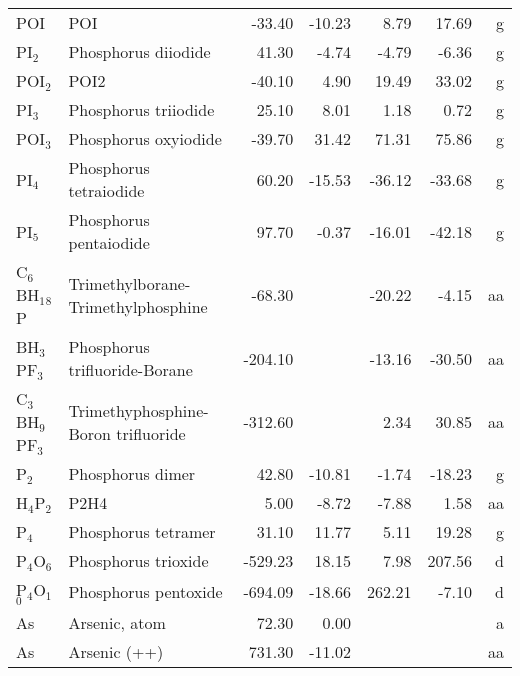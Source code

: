 \begin{table}
\begin{center}
\begin{tabular}{llrrrrr}
 POI         & POI                                    &   -33.40    &   -10.23  &     8.79  &    17.69  &      g\\
 PI$_2$         & Phosphorus diiodide                    &    41.30    &    -4.74  &    -4.79  &    -6.36  &      g\\
 POI$_2$        & POI2                                   &   -40.10    &     4.90  &    19.49  &    33.02  &      g\\
 PI$_3$         & Phosphorus triiodide                   &    25.10    &     8.01  &     1.18  &     0.72  &      g\\
 POI$_3$        & Phosphorus oxyiodide                   &   -39.70    &    31.42  &    71.31  &    75.86  &      g\\
 PI$_4$         & Phosphorus tetraiodide                 &    60.20    &   -15.53  &   -36.12  &   -33.68  &      g\\
 PI$_5$         & Phosphorus pentaiodide                 &    97.70    &    -0.37  &   -16.01  &   -42.18  &      g\\
 C$_6$BH$_1$$_8$P     & Trimethylborane-Trimethylphosphine      &  -68.30    &  &   -20.22  &    -4.15  &     aa\\
 BH$_3$PF$_3$      & Phosphorus trifluoride-Borane          &  -204.10    &  &   -13.16  &   -30.50  &     aa\\
 C$_3$BH$_9$PF$_3$    & Trimethyphosphine-Boron trifluoride    &  -312.60    &  &     2.34  &    30.85  &     aa\\
 P$_2$          & Phosphorus dimer                       &    42.80    &   -10.81  &    -1.74  &   -18.23  &      g\\
 H$_4$P$_2$        & P2H4                                   &     5.00    &    -8.72  &    -7.88  &     1.58  &     aa\\
 P$_4$          & Phosphorus tetramer                    &    31.10    &    11.77  &     5.11  &    19.28  &      g\\
 P$_4$O$_6$        & Phosphorus trioxide                    &  -529.23    &    18.15  &     7.98  &   207.56  &      d\\
 P$_4$O$_1$$_0$       & Phosphorus pentoxide                   &  -694.09    &   -18.66  &   262.21  &    -7.10  &      d\\
 As          & Arsenic, atom                          &    72.30    &     0.00  &  &  &      a\\
 As          & Arsenic (++)                           &   731.30    &   -11.02  &  &  &     aa\\

\end{tabular}
\end{center}
\end{table}
